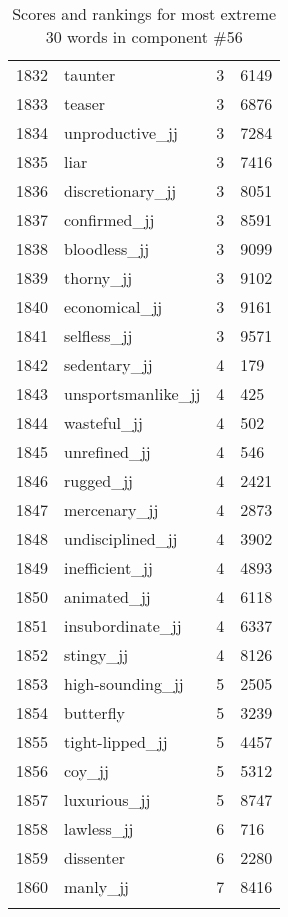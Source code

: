 \begin{longtable}[!htbp]{| rlr@{.}l |}
    1832 & taunter & 3 & 6149 \\
    1833 & teaser & 3 & 6876 \\
    1834 & unproductive\_jj & 3 & 7284 \\
    1835 & liar & 3 & 7416 \\
    1836 & discretionary\_jj & 3 & 8051 \\
    1837 & confirmed\_jj & 3 & 8591 \\
    1838 & bloodless\_jj & 3 & 9099 \\
    1839 & thorny\_jj & 3 & 9102 \\
    1840 & economical\_jj & 3 & 9161 \\
    1841 & selfless\_jj & 3 & 9571 \\
    1842 & sedentary\_jj & 4 & 179 \\
    1843 & unsportsmanlike\_jj & 4 & 425 \\
    1844 & wasteful\_jj & 4 & 502 \\
    1845 & unrefined\_jj & 4 & 546 \\
    1846 & rugged\_jj & 4 & 2421 \\
    1847 & mercenary\_jj & 4 & 2873 \\
    1848 & undisciplined\_jj & 4 & 3902 \\
    1849 & inefficient\_jj & 4 & 4893 \\
    1850 & animated\_jj & 4 & 6118 \\
    1851 & insubordinate\_jj & 4 & 6337 \\
    1852 & stingy\_jj & 4 & 8126 \\
    1853 & high-sounding\_jj & 5 & 2505 \\
    1854 & butterfly & 5 & 3239 \\
    1855 & tight-lipped\_jj & 5 & 4457 \\
    1856 & coy\_jj & 5 & 5312 \\
    1857 & luxurious\_jj & 5 & 8747 \\
    1858 & lawless\_jj & 6 & 716 \\
    1859 & dissenter & 6 & 2280 \\
    1860 & manly\_jj & 7 & 8416 \\
    \hline
    \caption{Scores and rankings for most extreme 30 words in component \#56} \\
\end{longtable}

